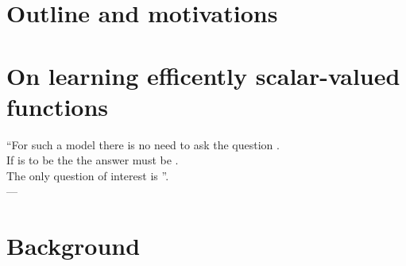 \chapter{Outline and motivations}
\label{ch:motivations}

\chapter{On learning efficently scalar-valued functions}
\label{ch:motivations}
\bigskip
\begin{flushright}
    ``For such a model there is no need to ask the question . \\
    If  is to be the  the answer must
    be . \\
    The only question of interest is ''. \\
    --- 
    \citep{box1979robustness}
\end{flushright}
\bigskip
\begin{justify}
\end{justify}
\minitoc


\chapter{Background}
\label{ch:background}
\bigskip
\begin{justify}
\end{justify}
\minitoc

